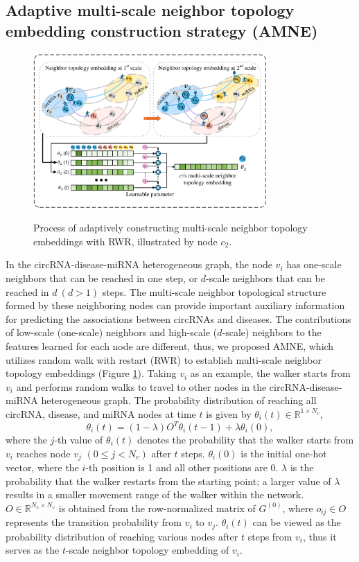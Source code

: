 \documentclass[journal,twoside,web]{ieeecolor}
\begin{document}
\subsection{Adaptive multi-scale neighbor topology embedding construction strategy (AMNE)}

\begin{figure}
    \centering
    \includegraphics[width=3.5in]{fig/visio3.pdf}\\       
	\caption{Process of adaptively constructing multi-scale neighbor topology embeddings with RWR, illustrated by node $c_{2}$.}
    \label{fig:visio3}
	\vspace{-0.4cm}
\end{figure}


In the circRNA-disease-miRNA heterogeneous graph, the node $v_i$ has one-scale neighbors that can be reached in one step, or $d$-scale neighbors that can be reached in $d\ (d > 1)$ steps. The multi-scale neighbor topological structure formed by these neighboring nodes can provide important auxiliary information for predicting the associations between circRNAs and diseases. The contributions of low-scale (one-scale) neighbors and high-scale ($d$-scale) neighbors to the features learned for each node are different, thus, we proposed AMNE, which utilizes random walk with restart (RWR) to establish multi-scale neighbor topology embeddings (Figure \ref{fig:visio3}). Taking $v_i$ as an example, the walker starts from $v_i$ and performs random walks to travel to other nodes in the circRNA-disease-miRNA heterogeneous graph. The probability distribution of reaching all circRNA, disease, and miRNA nodes at time $t$ is given by $\theta _i{(t)} \in \mathbb{R}^{1 \times N_v}$,
\begin{equation}
\theta _i{(t)} = (1 - \lambda) O^T \theta _i{(t-1)} + \lambda \theta _i{(0)},
\label{eq:eq4}
\end{equation}
where the $j$-th value of $\theta _i{(t)}$ denotes the probability that the walker starts from $v_i$ reaches node $v_j$ $(0 \leqslant j < N_v)$ after $t$ steps. $\theta _i{(0)}$ is the initial one-hot vector, where the $i$-th position is 1 and all other positions are 0. $\lambda$ is the probability that the walker restarts from the starting point; a larger value of $\lambda$ results in a smaller movement range of the walker within the network. $O \in \mathbb{R}^{N_v \times N_v}$ is obtained from the row-normalized matrix of $G^{(0)}$, where $o_{ij} \in O$ represents the transition probability from $v_i$ to $v_j$. $\theta _i{(t)}$ can be viewed as the probability distribution of reaching various nodes after $t$ steps from $v_i$, thus it serves as the $t$-scale neighbor topology embedding of $v_i$.
\end{document}
